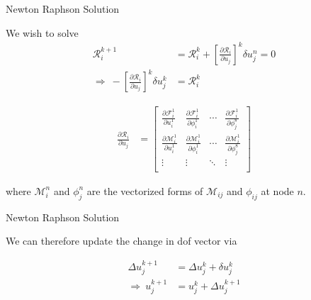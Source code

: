 \documentclass[11pt]{beamer}
\begin{document}
\begin{frame}{Newton Raphson Solution}

We wish to solve
\begin{align*}
\mathcal{R}^{k+1}_{i} &= \mathcal{R}^k_i + \left[\frac{\partial \mathcal{R}_i}{\partial u_j}\right]^k \delta u_j^n = 0\\
\Rightarrow\ -\left[\frac{\partial \mathcal{R}_i}{\partial u_j}\right]^k \delta u_j^k &= \mathcal{R}^k_i
\end{align*}

\begin{align*}
\frac{\partial \mathcal{R}_i}{\partial u_j} &= \left[\begin{array}{cccc}
\frac{\partial \mathcal{F}_i^1}{\partial u_i^1} & \frac{\partial \mathcal{F}_i^1}{\partial \phi_i^1} & \cdots & \frac{\partial \mathcal{F}_i^1}{\partial \phi_{j}^8}\\
\frac{\partial \mathcal{M}_i^1}{\partial u_i^1} & \frac{\partial \mathcal{M}_i^1}{\partial \phi_i^1} & \cdots & \frac{\partial \mathcal{M}_i^1}{\partial \phi_{j}^8}\\
\vdots & \vdots & \ddots & \vdots\\
\end{array}\right]
\end{align*}

where $\mathcal{M}_i^n$ and $\phi_{j}^n$ are the vectorized forms of $\mathcal{M}_{ij}$ and $\phi_{ij}$ at node $n$.

\end{frame}

\begin{frame}{Newton Raphson Solution}

We can therefore update the change in dof vector via

\begin{align*}
\Delta u_j^{k+1} &= \Delta u_j^k + \delta u_j^k\\
\Rightarrow\ u_j^{k+1} &= u_j^k + \Delta u_j^{k+1}
\end{align*}

\end{frame}
\end{document}
